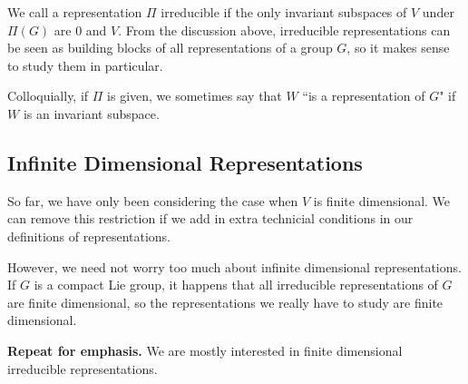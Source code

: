 We call a representation $\Pi$ irreducible if the only invariant subspaces of $V$ under $\Pi(G)$ are 0 and $V$. From the discussion above, irreducible representations can be seen as building blocks of all representations of a group $G$, so it makes sense to study them in particular.

Colloquially, if $\Pi$ is given, we sometimes say that $W$ ``is a representation of $G$" if $W$ is an invariant subspace.

\subsection{Infinite Dimensional Representations}
So far, we have only been considering the case when $V$ is finite dimensional. We can remove this restriction if we add in extra technicial conditions in our definitions of representations.

However, we need not worry too much about infinite dimensional representations. If $G$ is a compact Lie group, it happens that all irreducible representations of $G$ are finite dimensional, so the representations we really have to study are finite dimensional.

\textbf{Repeat for emphasis.} We are mostly interested in finite dimensional irreducible representations.
